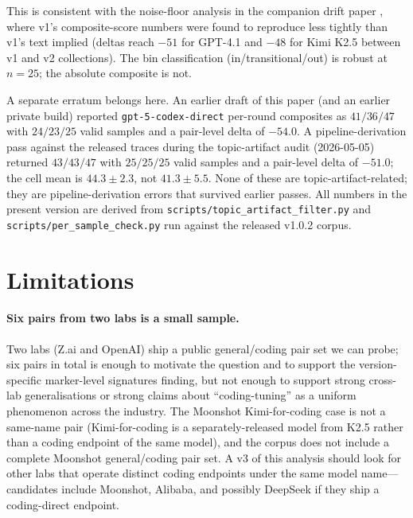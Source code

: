 \documentclass[11pt,a4paper]{article}
\begin{document}
This is consistent with the noise-floor analysis in the companion drift paper \citep{tenner2026drift}, where v1's composite-score numbers were found to reproduce less tightly than v1's text implied (deltas reach $-51$ for GPT-4.1 and $-48$ for Kimi K2.5 between v1 and v2 collections). The bin classification (in/transitional/out) is robust at $n{=}25$; the absolute composite is not.

A separate erratum belongs here. An earlier draft of this paper (and an earlier private build) reported \texttt{gpt-5-codex-direct} per-round composites as $41 / 36 / 47$ with $24/23/25$ valid samples and a pair-level delta of $-54.0$. A pipeline-derivation pass against the released traces during the topic-artifact audit (2026-05-05) returned $43/43/47$ with $25/25/25$ valid samples and a pair-level delta of $-51.0$; the cell mean is $44.3 \pm 2.3$, not $41.3 \pm 5.5$. None of these are topic-artifact-related; they are pipeline-derivation errors that survived earlier passes. All numbers in the present version are derived from \texttt{scripts/topic\_artifact\_filter.py} and \texttt{scripts/per\_sample\_check.py} run against the released v1.0.2 corpus.

\section{Limitations}
\label{sec:limitations}

\paragraph{Six pairs from two labs is a small sample.} Two labs (Z.ai and OpenAI) ship a public general/coding pair set we can probe; six pairs in total is enough to motivate the question and to support the version-specific marker-level signatures finding, but not enough to support strong cross-lab generalisations or strong claims about ``coding-tuning'' as a uniform phenomenon across the industry. The Moonshot Kimi-for-coding case is not a same-name pair (Kimi-for-coding is a separately-released model from K2.5 rather than a coding endpoint of the same model), and the corpus does not include a complete Moonshot general/coding pair set. A v3 of this analysis should look for other labs that operate distinct coding endpoints under the same model name---candidates include Moonshot, Alibaba, and possibly DeepSeek if they ship a coding-direct endpoint.
\end{document}

